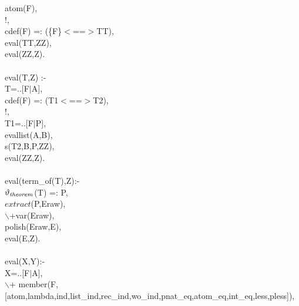 \documentclass[11pt]{report}
\begin{document}
\begin{sf}
\begin{tabbing}
\hspace{2em}atom(F),\\[-0.15ex]
\hspace{2em}!,\\[-0.15ex]
\hspace{2em}cdef(F) =: (\{F\}$<$==$>$TT),\\[-0.15ex]
\hspace{2em}eval(TT,ZZ),\\[-0.15ex]
\hspace{2em}eval(ZZ,Z).\\[-0.7ex]
\\[-0.15ex]
eval(T,Z) :-\\[-0.15ex]
\hspace{2em}T=..[F$\mid$A],\\[-0.15ex]
\hspace{2em}cdef(F) =: (T1$<$==$>$T2),\\[-0.15ex]
\hspace{2em}!,\\[-0.15ex]
\hspace{2em}T1=..[F$\mid$P],\\[-0.15ex]
\hspace{2em}evallist(A,B),\\[-0.15ex]
\hspace{2em}s(T2,B,P,ZZ),\\[-0.15ex]
\hspace{2em}eval(ZZ,Z).\\[-0.7ex]
\\[-0.15ex]
eval(term\_\hspace{0.1em}of(T),Z):-\\[-0.15ex]
\hspace{2em}$\vartheta_{\it theorem}$(T) =: P,\\[-0.15ex]
\hspace{2em}$extract$(P,Eraw),\\[-0.15ex]
\hspace{2em}$\backslash$+var(Eraw),\\[-0.15ex]
\hspace{2em}polish(Eraw,E),\\[-0.15ex]
\hspace{2em}eval(E,Z).\\[-0.7ex]
\\[-0.15ex]
eval(X,Y):-\\[-0.15ex]
\hspace{1em}X=..[F$\mid$A],\\[-0.15ex]
\hspace{1em}$\backslash$+ member(F,[atom,lambda,ind,list\_\hspace{0.1em}ind,rec\_\hspace{0.1em}ind,wo\_\hspace{0.1em}ind,pnat\_\hspace{0.1em}eq,atom\_\hspace{0.1em}eq,int\_\hspace{0.1em}eq,less,pless]),\\[-0.15ex]

\end{tabbing}
\end{sf}
\end{document}
